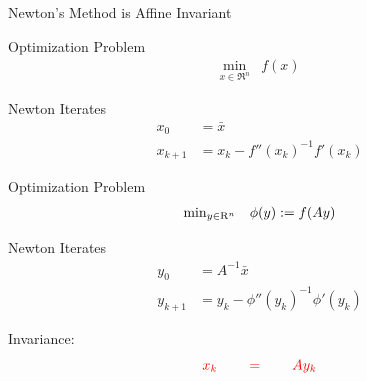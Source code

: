 \documentclass[9pt]{beamer}
\begin{document}
\begin{frame}{Newton's Method is Affine Invariant}


  
  \begin{minipage}{0.5\textwidth}

    Optimization Problem
    \[
      \begin{array}{rl}
        \min_{x\in \Re^n} & f(x)
      \end{array}
    \]

    \vfill

    Newton Iterates
    \[
      \begin{array}{rl}
        x_0 & = \bar x \\[0.5em]
              x_{k+1} & = x_k - f''(x_k)^{-1}f'(x_k)
      \end{array}
    \]

    \vfill

    \centering
    
  \end{minipage}%
  \hfill
  \begin{minipage}{0.5\textwidth}

    Optimization Problem
    \[
      \begin{array}{rl}
        \min_{y\in \mathrm{R}^n} & \phi(y):= f(A y)
      \end{array}
    \]

    \vfill

    Newton Iterates
    \[
      \begin{array}{rl}
        y_0 & = A^{-1} \bar x \\[0.5em]
        y_{k+1} & = y_k - \phi''(y_k)^{-1}\phi'(y_k)
      \end{array}
    \]

    \vfill
    
    \centering
    
  \end{minipage}
  \vfill

  Invariance:
  \[
    {\color{red} x_k\qquad=\qquad Ay_{k}}
  \]
\end{frame}

\end{document}
